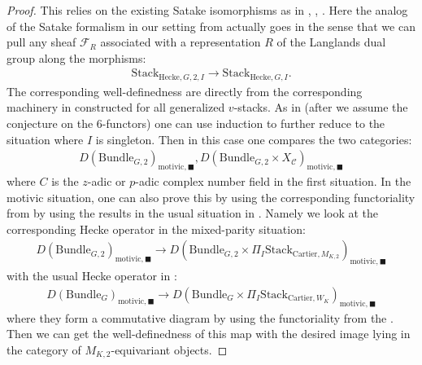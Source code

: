 \documentclass[12pt]{book}
\theoremstyle{definition}
\begin{document}
\begin{proof}
This relies on the existing Satake isomorphisms as in \cite{FS}, \cite{RS}, \cite{Scho1}. Here the analog of the Satake formalism in our setting from \cite{FS} actually goes in the sense that we can pull any sheaf $\mathcal{F}_R$ associated with a representation $R$ of the Langlands dual group along the morphisms:
\begin{align}
\mathrm{Stack}_{\mathrm{Hecke},G,2,I} \rightarrow \mathrm{Stack}_{\mathrm{Hecke},G,I}.
\end{align} 
The corresponding well-definedness are directly from the corresponding machinery in \cite{FS} constructed for all generalized $v$-stacks. As in \cite[Corollary 2.3 in Chapter IX]{FS} (after we assume the conjecture on the 6-functors) one can use induction to further reduce to the situation where $I$ is singleton. Then in this case one compares the two categories:
\begin{align}
D(\mathrm{Bundle}_{G,2})_{\text{motivic},\blacksquare},D(\mathrm{Bundle}_{G,2}\times X_\mathcal{C})_{\text{motivic},\blacksquare}
\end{align}
where $C$ is the $z$-adic or $p$-adic complex number field in the first situation. In the motivic situation, one can also prove this by using the corresponding functoriality from \cite{Scho1} by using the results in the usual situation in \cite{Scho1}. Namely we look at the corresponding Hecke operator in the mixed-parity situation:
\begin{align}
D(\mathrm{Bundle}_{G,2})_{\text{motivic},\blacksquare} \rightarrow D(\mathrm{Bundle}_{G,2}\times \Pi_I \mathrm{Stack}_{\mathrm{Cartier},M_{K,2}})_{\text{motivic},\blacksquare}
\end{align}
with the usual Hecke operator in \cite{FS}:
\begin{align}
D(\mathrm{Bundle}_{G})_{\text{motivic},\blacksquare} \rightarrow D(\mathrm{Bundle}_{G}\times \Pi_I \mathrm{Stack}_{\mathrm{Cartier},W_{K}})_{\text{motivic},\blacksquare}
\end{align}
where they form a commutative diagram by using the functoriality from the \cite{Scho1}. Then we can get the well-definedness of this map with the desired image lying in the category of $M_{K,2}$-equivariant objects. 
\end{proof}
\end{document}
